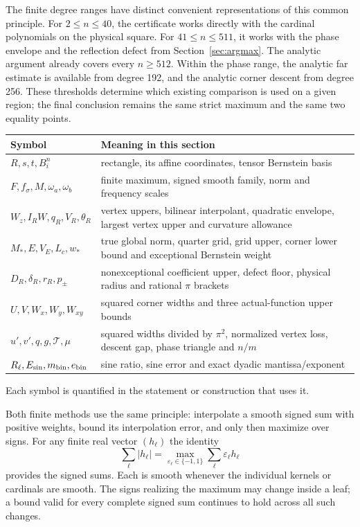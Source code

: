 The finite degree ranges have distinct convenient representations of
this common principle. For $2\leq n\leq40$, the certificate works directly
with the cardinal polynomials on the physical square. For
$41\leq n\leq511$, it works with the phase envelope and the reflection
defect from Section~\ref{sec:argmax}. The analytic argument already
covers every $n\geq512$. Within the phase range, the analytic far estimate
is available from degree 192, and the analytic corner descent from
degree 256. These thresholds determine which existing comparison is
used on a given region; the final conclusion remains the same strict
maximum and the same two equality points.

\begin{center}\small
\begin{tabular}{@{}p{.25\linewidth}p{.67\linewidth}@{}}
\toprule Symbol & Meaning in this section\\\midrule
$R,s,t,B_i^n$ & rectangle, its affine coordinates, tensor Bernstein basis\\
$F,f_\sigma,M,\omega_a,\omega_b$ & finite maximum, signed smooth family, norm and frequency scales\\
$W_z,I_RW,q_R,V_R,\theta_R$ & vertex uppers, bilinear interpolant, quadratic envelope, largest vertex upper and curvature allowance\\
$M_*,E,V_E,L_c,w_*$ & true global norm, quarter grid, grid upper, corner lower bound and exceptional Bernstein weight\\
$D_R,\delta_R,r_R,p_\pm$ & nonexceptional coefficient upper, defect floor, physical radius and rational $\pi$ brackets\\
$U,V,W_x,W_y,W_{xy}$ & squared corner widths and three actual-function upper bounds\\
$u',v',q,g,\mathcal T,\mu$ & squared widths divided by $\pi^2$, normalized vertex loss, descent gap, phase triangle and $n/m$\\
$R_\ell,E_{\rm sin},m_{\rm bin},e_{\rm bin}$ & sine ratio, sine error and exact dyadic mantissa/exponent\\
\bottomrule
\end{tabular}
\end{center}
Each symbol is quantified in the statement or construction that uses it.

Both finite
methods use the same principle: interpolate a smooth signed sum with positive
weights, bound its interpolation error, and only then maximize over signs.
For any finite real vector $(h_\ell)$ the identity
\[
 \sum_\ell|h_\ell|=\max_{\varepsilon_\ell\in\{-1,1\}}
                         \sum_\ell\varepsilon_\ell h_\ell
\]
provides the signed sums. Each is smooth whenever the individual
kernels or cardinals are smooth. The signs realizing the maximum may
change inside a leaf; a bound valid for every complete signed sum
continues to hold across all such changes.

